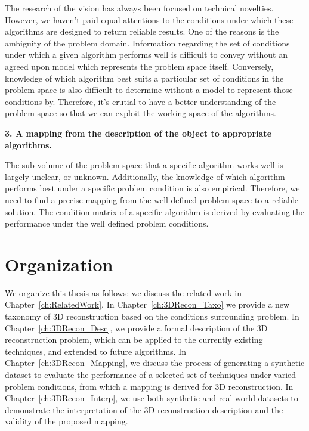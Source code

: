 The research of the vision has always been focused on technical novelties. However, we haven't paid equal attentions to the conditions under which these algorithms are designed to return reliable results. One of the reasons is the ambiguity of the problem domain. Information regarding the set of conditions under which a given algorithm performs well is difficult to convey without an agreed upon model which represents the problem space itself. Conversely, knowledge of which algorithm best suits a particular set of conditions in the problem space is also difficult to determine without a model to represent those conditions by. Therefore, it's crutial to have a better understanding of the problem space so that we can exploit the working space of the algorithms.

\noindent\textbf{3. A mapping from the description of the object to appropriate algorithms.}

The sub-volume of the problem space that a specific algorithm works well is largely unclear, or unknown. Additionally, the knowledge of which algorithm performs best under a specific problem condition is also empirical. Therefore, we need to find a precise mapping from the well defined problem space to a reliable solution. The condition matrix of a specific algorithm is derived by evaluating the performance under the well defined problem conditions.



\section{Organization}
We organize this thesis as follows: we discuss the related work in Chapter~\ref{ch:RelatedWork}. In Chapter~\ref{ch:3DRecon_Taxo} we provide a new taxonomy of 3D reconstruction based on the conditions surrounding problem. In Chapter~\ref{ch:3DRecon_Desc}, we provide a formal description of the 3D reconstruction problem, which can be applied to the currently existing techniques, and extended to future algorithms. In Chapter~\ref{ch:3DRecon_Mapping}, we discuss the process of generating a synthetic dataset to evaluate the performance of a selected set of techniques under varied problem conditions, from which a mapping is derived for 3D reconstruction. In Chapter~\ref{ch:3DRecon_Interp}, we use both synthetic and real-world datasets to demonstrate the interpretation of the 3D reconstruction description and the validity of the proposed mapping.